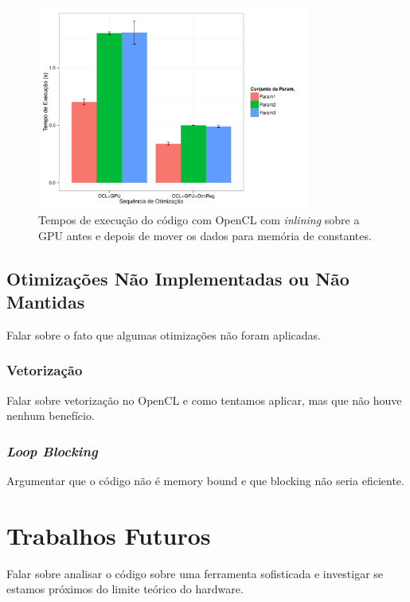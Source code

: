 \documentclass[12pt]{article}
\begin{document}
\begin{figure}[H]
\centering
\includegraphics[width=0.8\textwidth]{oclpressure.pdf}
\caption{Tempos de execução do código com OpenCL com \textit{inlining} sobre a GPU antes e depois de mover os dados para memória de constantes.}
\label{fgclpressure}
\end{figure}

\subsection{Otimizações Não Implementadas ou Não Mantidas}

Falar sobre o fato que algumas otimizações não foram aplicadas.

\subsubsection{Vetorização}

Falar sobre vetorização no OpenCL e como tentamos aplicar, mas que não houve nenhum benefício.

\subsubsection{\textit{Loop Blocking}}

Argumentar que o código não é memory bound e que blocking não seria eficiente.

\section{Trabalhos Futuros}

Falar sobre analisar o código sobre uma ferramenta sofisticada e investigar se estamos próximos do limite teórico do hardware.
\end{document}
